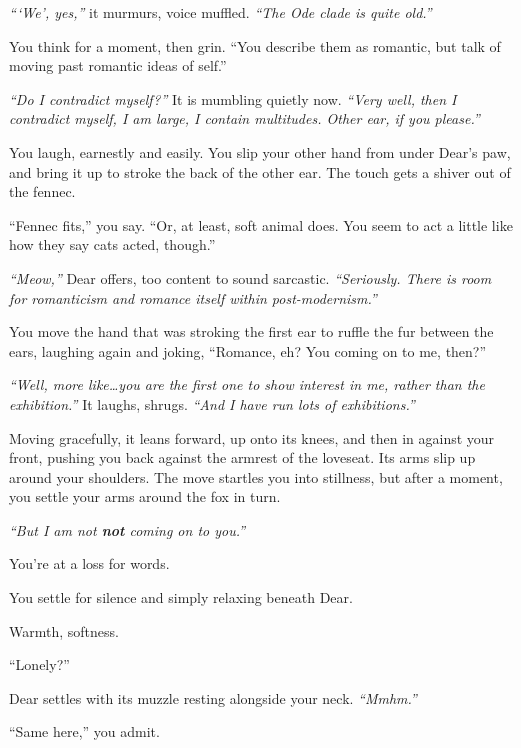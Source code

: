 \emph{```We', yes,''} it murmurs, voice muffled. \emph{``The Ode clade is quite old.''}

You think for a moment, then grin. ``You describe them as romantic, but talk of moving past romantic ideas of self.''

\emph{``Do I contradict myself?''} It is mumbling quietly now. \emph{``Very well, then I contradict myself, I am large, I contain multitudes. Other ear, if you please.''}

You laugh, earnestly and easily. You slip your other hand from under Dear's paw, and bring it up to stroke the back of the other ear. The touch gets a shiver out of the fennec.

``Fennec fits,'' you say. ``Or, at least, soft animal does. You seem to act a little like how they say cats acted, though.''

\emph{``Meow,''} Dear offers, too content to sound sarcastic. \emph{``Seriously. There is room for romanticism and romance itself within post-modernism.''}

You move the hand that was stroking the first ear to ruffle the fur between the ears, laughing again and joking, ``Romance, eh? You coming on to me, then?''

\emph{``Well, more like\ldots{}you are the first one to show interest in me, rather than the exhibition.''} It laughs, shrugs. \emph{``And I have run lots of exhibitions.''}

Moving gracefully, it leans forward, up onto its knees, and then in against your front, pushing you back against the armrest of the loveseat. Its arms slip up around your shoulders. The move startles you into stillness, but after a moment, you settle your arms around the fox in turn.

\emph{``But I am not \textbf{not} coming on to you.''}

You're at a loss for words.

\phantom{You're at a loss for words. }{\scriptsize ``I'm flattered, but--''}

\phantom{You're at a loss for words. }{\tiny ``You're sweet, you know--''}

You settle for silence and simply relaxing beneath Dear.

Warmth, softness.

``Lonely?''

Dear settles with its muzzle resting alongside your neck. \emph{``Mmhm.''}

``Same here,'' you admit.

